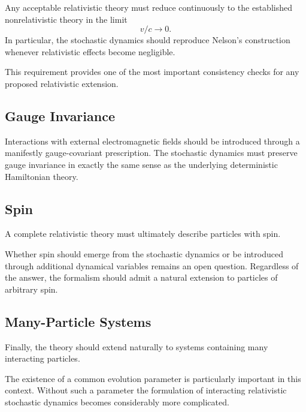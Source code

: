 Any acceptable relativistic theory must reduce continuously to the
established nonrelativistic theory in the limit
\[v/c \rightarrow 0.\]
In particular, the stochastic dynamics should reproduce Nelson's
construction whenever relativistic effects become negligible.

This requirement provides one of the most important consistency checks
for any proposed relativistic extension.

\subsection{Gauge Invariance}

Interactions with external electromagnetic fields should be introduced
through a manifestly gauge-covariant prescription. The stochastic
dynamics must preserve gauge invariance in exactly the same sense as the
underlying deterministic Hamiltonian theory.

\subsection{Spin}

A complete relativistic theory must ultimately describe particles with
spin.

Whether spin should emerge from the stochastic dynamics or be introduced
through additional dynamical variables remains an open question.
Regardless of the answer, the formalism should admit a natural extension
to particles of arbitrary spin.

\subsection{Many-Particle Systems}

Finally, the theory should extend naturally to systems containing many
interacting particles.

The existence of a common evolution parameter is particularly important
in this context. Without such a parameter the formulation of interacting
relativistic stochastic dynamics becomes considerably more complicated.

